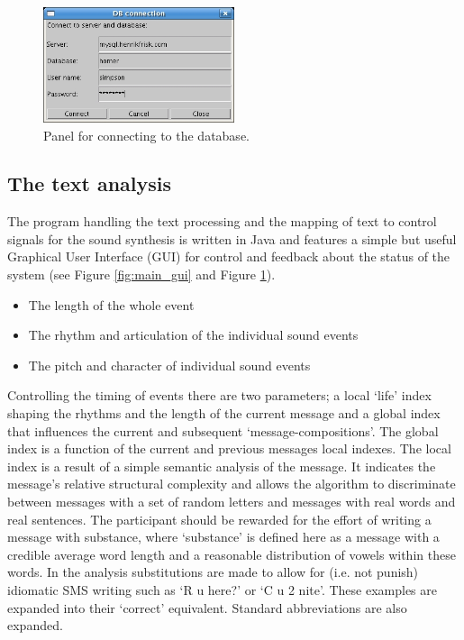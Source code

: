 \begin{figure}[hbp]
  \centering
  \includegraphics[width=0.5\textwidth]{img/ethsnd/DB_connection_window}
  \caption{Panel for connecting to the database.}
  \label{fig:DBpane}
\end{figure}

\subsection{The text analysis}
The program handling the text processing and the mapping of text to control signals for the sound synthesis is written in Java \citep{j2se} and features a simple but useful Graphical User Interface (GUI) for control and feedback about the status of the system (see Figure \ref{fig:main_gui} and Figure \ref{fig:DBpane}).  

\begin{itemize}
\item{The length of the whole event}
\item{The rhythm and articulation of the individual sound events}
\item{The pitch and character of individual sound events}
\end{itemize}
Controlling the timing of events there are two parameters; a local `life' index shaping the rhythms and the length of the current message and a global index that influences the current and subsequent `message-compositions'. The global index is a function of the current and previous messages local indexes. The local index is a result of a simple semantic analysis of the message. It indicates the message's relative structural complexity and allows the algorithm to discriminate between messages with a set of random letters and messages with real words and real sentences. The participant should be rewarded for the effort of writing a message with substance, where `substance' is defined here as a message with a credible average word length and a reasonable distribution of vowels within these words. In the analysis substitutions are made to allow for (i.e. not punish) idiomatic SMS writing such as `R u here?' or `C u 2 nite'. These examples are expanded into their `correct' equivalent. Standard abbreviations are also expanded. 

